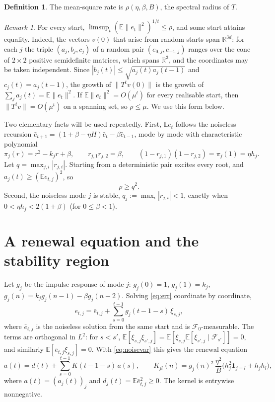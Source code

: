 \documentclass[11pt]{amsart}
\theoremstyle{definition}
\newtheorem{definition}[theorem]{Definition}
\theoremstyle{remark}
\newtheorem{remark}[theorem]{Remark}
\numberwithin{equation}{section}
\newcommand{\E}{\mathbb{E}}
\newcommand{\R}{\mathbb{R}}
\begin{document}
\begin{definition}
The mean-square rate is $\rho(\eta,\beta,B)$, the spectral radius of $T$.
\end{definition}

\begin{remark}\label{rem:rate}
For every start, $\limsup_t(\E\|e_t\|^2)^{1/t}\le\rho$, and some start attains equality. Indeed, the vectors $v(0)$ that arise from random starts span $\R^{3d}$: for each $j$ the triple $(a_j,b_j,c_j)$ of a random pair $(e_{0,j},e_{-1,j})$ ranges over the cone of $2\times2$ positive semidefinite matrices, which spans $\R^3$, and the coordinates may be taken independent. Since $|b_j(t)|\le\sqrt{a_j(t)a_j(t-1)}$ and $c_j(t)=a_j(t-1)$, the growth of $\|T^tv(0)\|$ is the growth of $\sum_ja_j(t)=\E\|e_t\|^2$. If $\E\|e_t\|^2=O(\mu^t)$ for every realisable start, then $\|T^tv\|=O(\mu^t)$ on a spanning set, so $\rho\le\mu$. We use this form below.
\end{remark}

Two elementary facts will be used repeatedly. First, $\E e_t$ follows the noiseless recursion $\bar e_{t+1}=(1+\beta-\eta H)\bar e_t-\beta\bar e_{t-1}$, mode by mode with characteristic polynomial
\[
\pi_j(r)=r^2-k_jr+\beta,\qquad r_{j,1}r_{j,2}=\beta,\qquad (1-r_{j,1})(1-r_{j,2})=\pi_j(1)=\eta h_j .
\]
Let $q=\max_{j,i}|r_{j,i}|$. Starting from a deterministic pair excites every root, and $a_j(t)\ge(\E e_{t,j})^2$, so
\begin{equation}\label{eq:jensen}
\rho\ge q^2 .
\end{equation}
Second, the noiseless mode $j$ is stable, $q_j:=\max_i|r_{j,i}|<1$, exactly when $0<\eta h_j<2(1+\beta)$ (for $0\le\beta<1$).

\section{A renewal equation and the stability region}\label{sec:renewal}

Let $g_j$ be the impulse response of mode $j$: $g_j(0)=1$, $g_j(1)=k_j$, $g_j(n)=k_jg_j(n-1)-\beta g_j(n-2)$. Solving \eqref{eq:err} coordinate by coordinate,
\[
e_{t,j}=\bar e_{t,j}+\sum_{s=0}^{t-1}g_j(t-1-s)\,\xi_{s,j},
\]
where $\bar e_{t,j}$ is the noiseless solution from the same start and is $\mathcal F_0$-measurable. The terms are orthogonal in $L^2$: for $s<s'$, $\E[\xi_{s,j}\xi_{s',j}]=\E[\xi_{s,j}\E[\xi_{s',j}\mid\mathcal F_{s'}]]=0$, and similarly $\E[\bar e_{t,j}\xi_{s,j}]=0$. With \eqref{eq:noisevar} this gives the renewal equation
\begin{equation}\label{eq:renewal}
a(t)=d(t)+\sum_{s=0}^{t-1}K(t-1-s)\,a(s),\qquad K_{jl}(n)=g_j(n)^2\,\frac{\eta^2}{B}\bigl(h_j^2\mathbf 1_{j=l}+h_jh_l\bigr),
\end{equation}
where $a(t)=(a_j(t))_j$ and $d_j(t)=\E\bar e_{t,j}^2\ge0$. The kernel is entrywise nonnegative.
\end{document}
